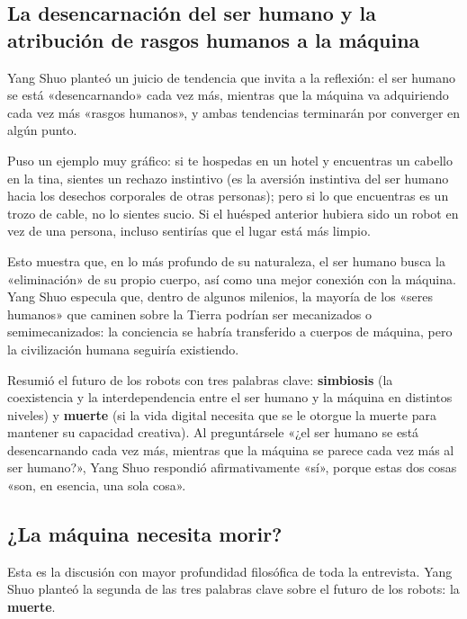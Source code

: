 \subsection{La desencarnación del ser humano y la atribución de rasgos humanos a la máquina}

Yang Shuo planteó un juicio de tendencia que invita a la reflexión: el ser humano se está «desencarnando» cada vez más, mientras que la máquina va adquiriendo cada vez más «rasgos humanos», y ambas tendencias terminarán por converger en algún punto.

Puso un ejemplo muy gráfico: si te hospedas en un hotel y encuentras un cabello en la tina, sientes un rechazo instintivo (es la aversión instintiva del ser humano hacia los desechos corporales de otras personas); pero si lo que encuentras es un trozo de cable, no lo sientes sucio. Si el huésped anterior hubiera sido un robot en vez de una persona, incluso sentirías que el lugar está más limpio.

Esto muestra que, en lo más profundo de su naturaleza, el ser humano busca la «eliminación» de su propio cuerpo, así como una mejor conexión con la máquina. Yang Shuo especula que, dentro de algunos milenios, la mayoría de los «seres humanos» que caminen sobre la Tierra podrían ser mecanizados o semimecanizados: la conciencia se habría transferido a cuerpos de máquina, pero la civilización humana seguiría existiendo.

Resumió el futuro de los robots con tres palabras clave: \textbf{simbiosis} (la coexistencia y la interdependencia entre el ser humano y la máquina en distintos niveles) y \textbf{muerte} (si la vida digital necesita que se le otorgue la muerte para mantener su capacidad creativa). Al preguntársele «¿el ser humano se está desencarnando cada vez más, mientras que la máquina se parece cada vez más al ser humano?», Yang Shuo respondió afirmativamente «sí», porque estas dos cosas «son, en esencia, una sola cosa».

\subsection{¿La máquina necesita morir?}

Esta es la discusión con mayor profundidad filosófica de toda la entrevista. Yang Shuo planteó la segunda de las tres palabras clave sobre el futuro de los robots: la \textbf{muerte}.

